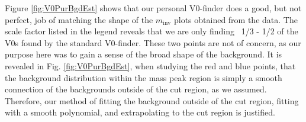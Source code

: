 \documentclass[/home/jesse/Analysis/FemtoAnalysis/AnalysisNotes/AnalysisNoteJBuxton.tex]{subfiles}
\begin{document}
Figure \ref{fig:V0PurBgdEst} shows that our personal V0-finder does a good, but not perfect, job of matching the shape of the $m_{\mathrm{inv}}$ plots obtained from the data.  The scale factor listed in the legend reveals that we are only finding ~1/3 - 1/2 of the V0s found by the standard V0-finder.  These two points are not of concern, as our purpose here was to gain a sense of the broad shape of the background.  It is revealed in Fig. \ref{fig:V0PurBgdEst}, when studying the red and blue points, that the background distribution within the mass peak region is simply a smooth connection of the backgrounds outside of the cut region, as we assumed.  Therefore, our method of fitting the background outside of the cut region, fitting with a smooth polynomial, and extrapolating to the cut region is justified.
\end{document}
